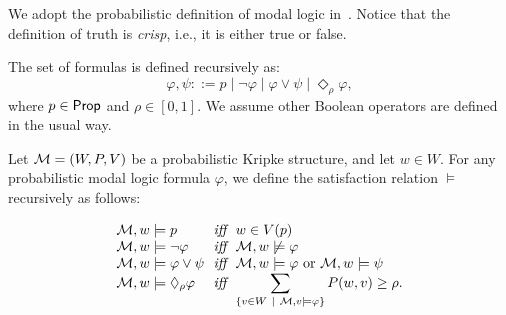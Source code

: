 
We adopt the probabilistic definition of modal logic in~\cite{ALDINI2024109167}. Notice that the definition of truth is \emph{crisp}, i.e., it is either true or false.

\begin{definition}[Formulas] 
The set of formulas is defined recursively as:
\[
\varphi, \psi ::= p \mid \neg \varphi \mid \varphi \vee \psi \mid \Diamond_\rho \varphi,
\]
where $p\in\mathsf{Prop}$ and $\rho \in [0,1]$. We assume other Boolean operators are defined in the usual way.
\end{definition}

\begin{definition}[Satisfaction]
Let $\mathcal{M} = (W, P, V)$ be a probabilistic Kripke structure, and let $w\in W$. For any probabilistic modal logic formula $\varphi$, we define 
the satisfaction relation $\models$ recursively as follows:

\[
\begin{array}{l@{\ \  }c@{\ \ }l}
\M,w \models p & \iff & w\in V(p) \\
\M,w \models \neg\varphi & \iff & \M,w\not\models\varphi \\
\M,w \models \varphi\vee\psi & \iff & \M,w\models\varphi \text{ or } \M,w\models\psi \\
\M,w \models \Diamond_\rho\varphi & \iff & \displaystyle\sum_{\{v\in W \ \mid \ \M,v\models\varphi\}} P(w, v) \ge \rho.
\end{array}
\]
\end{definition}

